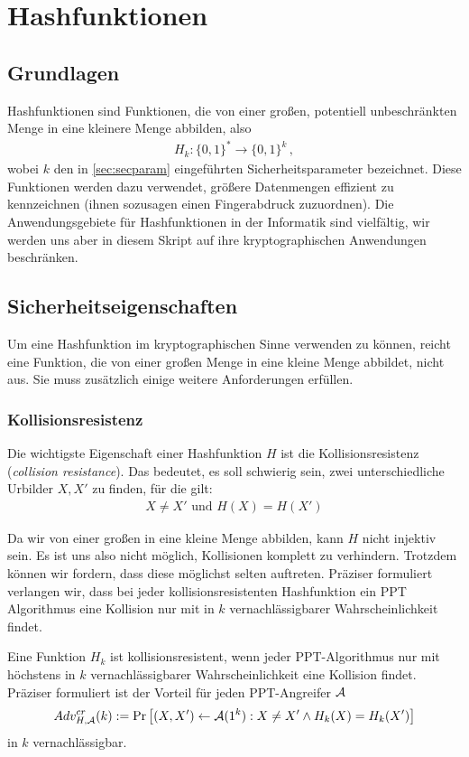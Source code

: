 \chapter{Hashfunktionen}\label{cha:hash}
\section{Grundlagen}
Hashfunktionen sind Funktionen, die von einer großen, potentiell unbeschränkten Menge in eine kleinere Menge abbilden, also
\begin{align*}
H_k\colon \{0,1\}^* \rightarrow \{0,1\}^k\, ,
\end{align*}
wobei $k$ den in \ref{sec:secparam} eingeführten Sicherheitsparameter bezeichnet.
Diese Funktionen werden dazu verwendet, größere Datenmengen effizient zu kennzeichnen (ihnen sozusagen einen Fingerabdruck zuzuordnen). Die Anwendungsgebiete für Hashfunktionen in der Informatik sind vielfältig, wir werden uns aber in diesem Skript auf ihre kryptographischen Anwendungen beschränken.

\section{Sicherheitseigenschaften}
Um eine Hashfunktion im kryptographischen Sinne verwenden zu können, reicht eine Funktion, die von einer großen Menge in eine kleine Menge abbildet, nicht aus.
Sie muss zusätzlich einige weitere Anforderungen erfüllen.

\subsection{Kollisionsresistenz}
Die wichtigste Eigenschaft einer Hashfunktion $H$ ist die Kollisionsresistenz (\textit{collision resistance}). Das bedeutet, es soll schwierig sein, zwei
unterschiedliche Urbilder $X, X'$ zu finden, für die gilt: 
\begin{align*}
X \neq X' \text{ und } H(X) = H(X')
\end{align*}

Da wir von einer großen in eine kleine Menge abbilden, kann $H$ nicht injektiv sein. Es ist uns also nicht möglich, Kollisionen komplett zu
verhindern. Trotzdem können wir fordern, dass diese möglichst selten auftreten. Präziser formuliert verlangen wir, dass bei jeder
kollisionsresistenten Hashfunktion ein PPT Algorithmus eine Kollision
nur mit in $k$ vernachlässigbarer Wahrscheinlichkeit findet.
\begin{definition}[Kollisionsresistenz]
Eine Funktion $H_k$ ist kollisionsresistent, wenn jeder PPT-Algorithmus
nur mit höchstens in $k$ vernachlässigbarer Wahrscheinlichkeit eine Kollision findet.
Präziser formuliert ist der Vorteil für jeden PPT-Angreifer $\mathcal{A}$
\begin{align*}
Adv^{cr}_{H,\mathcal{A}}(k):= \Pr \left[ (X, X') \leftarrow \mathcal{A}(1^k) : X \neq X' \land H_k(X) = H_k(X')\right]
\end{align*}
in $k$ vernachlässigbar.
\end{definition}

